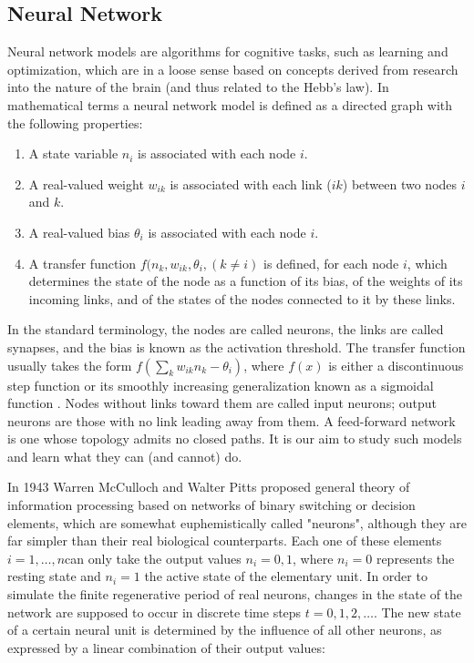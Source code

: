 \subsection{Neural Network}\label{sec:ArtificialNeuralNetworks}
Neural network models are algorithms for cognitive tasks, such as learning and optimization, which are in a loose sense based on concepts derived from research into the nature of the brain (and thus related to the Hebb's law). In mathematical terms a neural network model is defined as a directed graph with the following properties: 
\begin{enumerate}
    \item A state variable $n_{i}$ is associated with each node $i$.
    \item A real-valued weight $w_{ik}$ is associated with each link ($ik$) between two nodes $i$ and $k$.
    \item A real-valued bias $\theta_{i}$ is associated with each node $i$.
    \item A transfer function $f(n_{k},w_{ik},\theta_i,(k\neq i)$ is defined, for each node $i$, which determines the state of the node as a function of its bias, of the weights of its incoming links, and of the states of the nodes connected to it by these links.
    
\end{enumerate}
In the standard terminology, the nodes are called neurons, the links are called synapses, and the bias is known as the activation threshold. The transfer function usually takes the form $f(\sum_{k}w_{ik}n_{k}-\theta_i)$, where $f(x)$ is either a discontinuous step function or its smoothly increasing generalization known as a sigmoidal function . Nodes without links toward them are called input neurons; output neurons are those with no link leading away from them. A feed-forward network is one whose topology admits no closed paths. It is our aim to study such models and learn what they can (and cannot) do.


In 1943 Warren McCulloch and Walter Pitts proposed general theory of information processing based on networks of binary switching or decision elements, which are somewhat euphemistically called "neurons", although they are far simpler than their real biological counterparts. Each one of these elements $i = 1, \dots , n$can only take the output values $n_{i} = 0,1$, where $n_i = 0$ represents the resting state and $n_i = 1$ the active state of the elementary unit.
In order to simulate the finite regenerative period of real neurons, changes in the state of the network are supposed to occur in discrete time steps $t = 0, 1,2, \dots$. The new state of a certain neural unit is determined by the influence of all other neurons, as expressed by a linear combination of their output values:

